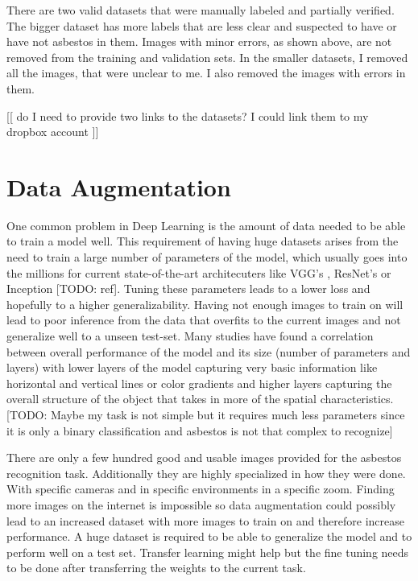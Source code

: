 There are two valid datasets that were manually labeled and partially verified. The bigger dataset has more labels that are less clear and suspected to have or have not asbestos in them. Images with minor errors, as shown above, are not removed from the training and validation sets. In the smaller datasets, I removed all the images, that were unclear to me. I also removed the images with errors in them.

[[ do I need to provide two links to the datasets? I could link them to my dropbox account ]]


\section{Data Augmentation}

One common problem in Deep Learning is the amount of data needed to be able to train a model well. This requirement of having huge datasets arises from the need to train a large number of parameters of the model, which usually goes into the millions for current state-of-the-art architecuters like VGG's \cite{simonyan2014very}, ResNet's \cite{he2016deep} or Inception [TODO: ref]. Tuning these parameters leads to a lower loss and hopefully to a higher generalizability. Having not enough images to train on will lead to poor inference from the data that overfits to the current images and not generalize well to a unseen test-set. Many studies have found a correlation between overall performance of the model and its size (number of parameters and layers) with lower layers of the model capturing very basic information like horizontal and vertical lines or color gradients and higher layers capturing the overall structure of the object that takes in more of the spatial characteristics. [TODO: Maybe my task is not simple but it requires much less parameters since it is only a binary classification and asbestos is not that complex to recognize]

There are only a few hundred good and usable images provided for the asbestos recognition task. Additionally they are highly specialized in how they were done. With specific cameras and in specific environments in a specific zoom. Finding more images on the internet is impossible so data augmentation could possibly lead to an increased dataset with more images to train on and therefore increase performance. A huge dataset is required to be able to generalize the model and to perform well on a test set. Transfer learning might help but the fine tuning needs to be done after transferring the weights to the current task.

